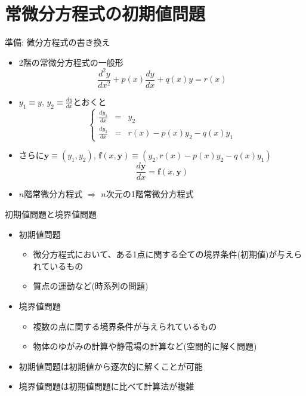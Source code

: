 \section{常微分方程式の初期値問題}

\begin{frame}[t,fragile]{準備: 微分方程式の書き換え}
  \begin{itemize}
  \item 2階の常微分方程式の一般形
    \[
    \frac{d^2y}{dx^2} + p(x)\frac{dy}{dx} + q(x)y = r(x)
    \]
  \item $y_1 \equiv y$, $y_2 \equiv \frac{dy}{dx}$とおくと
    \[
    \left\{
    \begin{array}{ccl}
      \frac{dy_1}{dx} & = & y_2 \\
      \frac{dy_2}{dx} & = & r(x) - p(x) y_2 - q(x) y_1
    \end{array}
    \right.
    \]
  \item さらに$\bm{y}\equiv(y_1, y_2)$, $\bm{f}(x, \bm{y})\equiv \left(y_2, r(x)-p(x)y_2 - q(x)y_1\right)$
    \[
    \frac{d\bm{y}}{dx} = \bm{f}(x, \bm{y})
    \]
  \item $n$階常微分方程式 $\Rightarrow$ $n$次元の1階常微分方程式
  \end{itemize}
\end{frame}

\begin{frame}[t,fragile]{初期値問題と境界値問題}
  \begin{itemize}
    \setlength{\itemsep}{1em}
  \item 初期値問題
    \begin{itemize}
    \item 微分方程式において、ある1点に関する全ての境界条件(初期値)が与えられているもの
    \item 質点の運動など(時系列の問題)
  \end{itemize}
  \item 境界値問題
    \begin{itemize}
    \item 複数の点に関する境界条件が与えられているもの
    \item 物体のゆがみの計算や静電場の計算など(空間的に解く問題)
  \end{itemize}
  \item 初期値問題は初期値から逐次的に解くことが可能
  \item 境界値問題は初期値問題に比べて計算法が複雑
  \end{itemize}
\end{frame}


